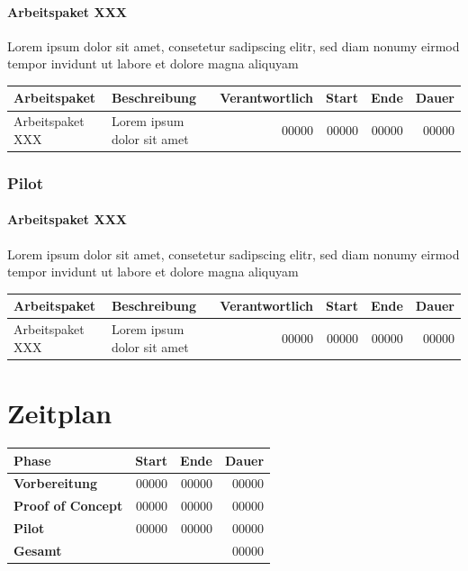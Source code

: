 \documentclass[a4paper,10pt]{scrartcl}
\begin{document}
\paragraph{Arbeitspaket XXX}
Lorem ipsum dolor sit amet, consetetur sadipscing elitr, sed diam nonumy eirmod tempor invidunt ut labore et dolore magna aliquyam
\hfill \vspace{5mm}
\begin{tabular}{llrrrr} 
\toprule
\textbf{Arbeitspaket} & \textbf{Beschreibung} & \textbf{Verantwortlich} & \textbf{Start} & \textbf{Ende} & \textbf{Dauer}\\
\midrule 
\midrule
Arbeitspaket XXX  & Lorem ipsum dolor sit amet & 00000 & 00000 & 00000 & 00000\\
\bottomrule
\end{tabular}



\vspace{5mm}
\subsubsection{Pilot}
\paragraph{Arbeitspaket XXX}
Lorem ipsum dolor sit amet, consetetur sadipscing elitr, sed diam nonumy eirmod tempor invidunt ut labore et dolore magna aliquyam
\hfill \vspace{5mm}
\begin{tabular}{llrrrr} 
\toprule
\textbf{Arbeitspaket} & \textbf{Beschreibung} & \textbf{Verantwortlich} & \textbf{Start} & \textbf{Ende} & \textbf{Dauer}\\ 
\midrule 
\midrule
Arbeitspaket XXX  & Lorem ipsum dolor sit amet & 00000 & 00000 & 00000 & 00000\\
\bottomrule
\end{tabular}

\vspace{5mm}

\section{Zeitplan}
\begin{tabular}{lrrr} 
\toprule
\textbf{Phase} & \textbf{Start} & \textbf{Ende} & \textbf{Dauer}\\ 
\midrule 
\midrule
\textbf{Vorbereitung} & 00000 & 00000 & 00000\\
\textbf{Proof of Concept} & 00000 & 00000 & 00000\\
\textbf{Pilot} & 00000 & 00000 & 00000\\
\midrule
\textbf{Gesamt} &  &  & 00000\\
\bottomrule
\end{tabular}
\end{document}
